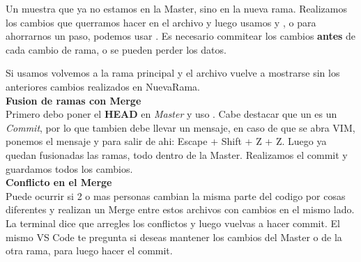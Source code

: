 \documentclass[]{article} %
\begin{document}
Un  muestra que ya no estamos en la Master, sino en la nueva rama. Realizamos los cambios que querramos hacer en el archivo y luego usamos  y , o para ahorrarnos un paso, podemos usar . Es necesario commitear los cambios \textbf{antes} de cada cambio de rama, o se pueden perder los datos.

Si usamos  volvemos a la rama principal y el archivo vuelve a mostrarse sin los anteriores cambios realizados en NuevaRama.\\

\textbf{Fusion de ramas con Merge}\\
Primero debo poner el \textbf{HEAD} en \textit{Master} y uso . Cabe destacar que un  es un \textit{Commit}, por lo que tambien debe llevar un mensaje, en caso de que se abra VIM, ponemos el mensaje y para salir de ahi: Escape + Shift + Z + Z.
Luego ya quedan fusionadas las ramas, todo dentro de la Master. Realizamos el commit y guardamos todos los cambios.\\

\textbf{Conflicto en el Merge}\\
Puede ocurrir si 2 o mas personas cambian la misma parte del codigo por cosas diferentes y realizan un Merge entre estos archivos con cambios en el mismo lado.
La terminal dice que arregles los conflictos y luego vuelvas a hacer commit. El mismo VS Code te pregunta si deseas mantener los cambios del Master o de la otra rama, para luego hacer el commit.
\end{document}
